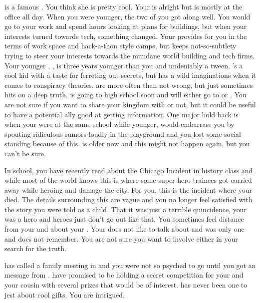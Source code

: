 \documentclass[char]{LRSguildcamp1}
\begin{document}
\cGrandma{} is a famous \cGrandma{\villain}. You think she is pretty cool. Your \cArchitect{\parent} is alright but is mostly at the office all day. When you were younger, the two of you got along well. You would go to your \cArchitect{\parent} work and spend hours looking at plans for buildings, but when your interests turned towards tech, something changed. Your \cArchitect{\parent} provides for you in the terms of work space and hack-a-thon style camps, but keeps not-so-subtlety trying to steer your interests towards the mundane world building and tech firms. Your younger \cTween{\sibling}, \cTween{}, is three years younger than you and undeniably a tween. \cTween{}'s a cool kid with a taste for ferreting out secrets, but has a wild imaginations when it comes to conspiracy theories. \cTween{\They} are more often than not wrong, but just sometimes hits on a deep truth. \cTween{} is going to high school soon and will either go to \pNormalSchool{} or \pSuperSchool{}. You are not sure if you want to share your kingdom with \cTween{\them} or not, but it could be useful to have a potential ally good at getting information. One major hold back is when your were at the same school while younger, \cTween{} would embarrass you by spouting ridiculous rumors loudly in the playground and you lost some social standing because of this. \cTween{} is older now and this might not happen again, but you can't be sure. 

In school, you have recently read about the Chicago Incident in history class and while most of the world knows this is where some super hero trainees got carried away while heroing and damage the city. For you, this is the incident where your \cAS{\parent} died. The details surrounding this are vague and you no longer feel satisfied with the story you were told as a child. That it was just a terrible quincidence, your \cAS{} was a hero and heroes just don't go out like that. You sometimes feel distance from your\cArchitect{\parent} and \cTween{} about your \cAS{\parent}. Your \cArchitect{\parent} does not like to talk about \cAS{} and \cTween{} was only one and does not remember. You are not sure you want to involve either in your search for the truth.

\cGrandma{} has called a family meeting in \pCityGrandma{} and you were not so psyched to go until you got an message from \cGrandma{}. \cGrandma{\they} have promised to be holding a secret competition for your and your cousin with several prizes that would be of interest. \cGrandma{} has never been one to jest about cool gifts. You are intrigued.  
\end{document}
